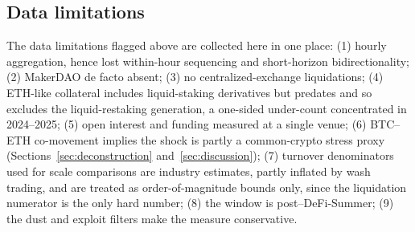 \subsection{Data limitations}
\label{sec:data-limits}

The data limitations flagged above are collected here in one place: (1)
hourly aggregation, hence lost within-hour sequencing and short-horizon
bidirectionality; (2) MakerDAO de facto absent; (3) no centralized-exchange
liquidations; (4) ETH-like collateral includes liquid-staking derivatives
but predates and so excludes the liquid-restaking generation, a one-sided
under-count concentrated in 2024--2025;
(5) open interest and funding measured at a single venue; (6) BTC--ETH
co-movement implies the shock is partly a common-crypto stress proxy
(Sections~\ref{sec:deconstruction} and~\ref{sec:discussion}); (7) turnover
denominators used for scale comparisons are industry estimates, partly
inflated by wash trading, and are treated as order-of-magnitude bounds only,
since the liquidation numerator is the only hard number; (8) the window is
post--DeFi-Summer; (9) the dust and exploit filters make the measure
conservative.